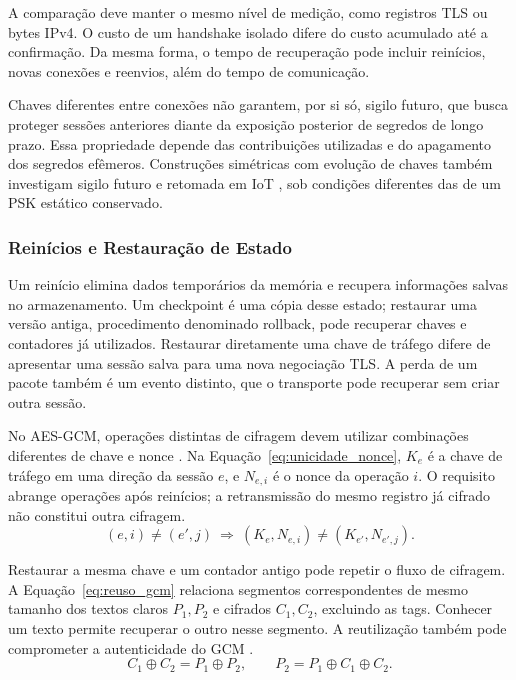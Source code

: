 A comparação deve manter o mesmo nível de medição, como registros TLS ou bytes IPv4. O custo de um handshake isolado difere do custo acumulado até a confirmação. Da mesma forma, o tempo de recuperação pode incluir reinícios, novas conexões e reenvios, além do tempo de comunicação.

Chaves diferentes entre conexões não garantem, por si só, sigilo futuro, que busca proteger sessões anteriores diante da exposição posterior de segredos de longo prazo. Essa propriedade depende das contribuições utilizadas e do apagamento dos segredos efêmeros. Construções simétricas com evolução de chaves também investigam sigilo futuro e retomada em IoT \cite{avoine2019iotfriendly}, sob condições diferentes das de um PSK estático conservado.

\subsubsection{Reinícios e Restauração de Estado}

Um reinício elimina dados temporários da memória e recupera informações salvas no armazenamento. Um checkpoint é uma cópia desse estado; restaurar uma versão antiga, procedimento denominado rollback, pode recuperar chaves e contadores já utilizados. Restaurar diretamente uma chave de tráfego difere de apresentar uma sessão salva para uma nova negociação TLS. A perda de um pacote também é um evento distinto, que o transporte pode recuperar sem criar outra sessão.

No AES-GCM, operações distintas de cifragem devem utilizar combinações diferentes de chave e nonce \cite{mcgrew2004gcm}. Na Equação~\ref{eq:unicidade_nonce}, \(K_e\) é a chave de tráfego em uma direção da sessão \(e\), e \(N_{e,i}\) é o nonce da operação \(i\). O requisito abrange operações após reinícios; a retransmissão do mesmo registro já cifrado não constitui outra cifragem.
\begin{equation}
(e,i)\neq(e',j)\ \Longrightarrow\ (K_e,N_{e,i})\neq(K_{e'},N_{e',j}).
\label{eq:unicidade_nonce}
\end{equation}

Restaurar a mesma chave e um contador antigo pode repetir o fluxo de cifragem. A Equação~\ref{eq:reuso_gcm} relaciona segmentos correspondentes de mesmo tamanho dos textos claros \(P_1,P_2\) e cifrados \(C_1,C_2\), excluindo as tags. Conhecer um texto permite recuperar o outro nesse segmento. A reutilização também pode comprometer a autenticidade do GCM \cite{bock2016nonce}.
\begin{equation}
C_1\oplus C_2=P_1\oplus P_2,\qquad
P_2=P_1\oplus C_1\oplus C_2.
\label{eq:reuso_gcm}
\end{equation}

